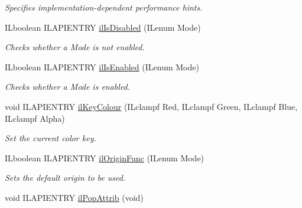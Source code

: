 \begin{DoxyCompactItemize}
\begin{DoxyCompactList}\small\item\em Specifies implementation-\/dependent performance hints. \end{DoxyCompactList}\item 
I\+Lboolean I\+L\+A\+P\+I\+E\+N\+T\+R\+Y \hyperlink{group__state_ga6fdd0b1ac89f9a43bdb3be9a23cbe354}{il\+Is\+Disabled} (I\+Lenum Mode)
\begin{DoxyCompactList}\small\item\em Checks whether a {\itshape Mode} is not enabled. \end{DoxyCompactList}\item 
I\+Lboolean I\+L\+A\+P\+I\+E\+N\+T\+R\+Y \hyperlink{group__state_ga8f2fb1299fd1cf25c2a959aa3837cc48}{il\+Is\+Enabled} (I\+Lenum Mode)
\begin{DoxyCompactList}\small\item\em Checks whether a {\itshape Mode} is enabled. \end{DoxyCompactList}\item 
\hypertarget{group__state_gaf3c1ed8cef65fe9816a3c00486d94fd2}{void I\+L\+A\+P\+I\+E\+N\+T\+R\+Y \hyperlink{group__state_gaf3c1ed8cef65fe9816a3c00486d94fd2}{il\+Key\+Colour} (I\+Lclampf Red, I\+Lclampf Green, I\+Lclampf Blue, I\+Lclampf Alpha)}\label{group__state_gaf3c1ed8cef65fe9816a3c00486d94fd2}

\begin{DoxyCompactList}\small\item\em Set the current color key. \end{DoxyCompactList}\item 
I\+Lboolean I\+L\+A\+P\+I\+E\+N\+T\+R\+Y \hyperlink{group__state_gab518656efaed3f7ca95857e367e62ccd}{il\+Origin\+Func} (I\+Lenum Mode)
\begin{DoxyCompactList}\small\item\em Sets the default origin to be used. \end{DoxyCompactList}\item 
\hypertarget{group__state_gacc9ee35a9e48b55880655f6d143f39c1}{void I\+L\+A\+P\+I\+E\+N\+T\+R\+Y \hyperlink{group__state_gacc9ee35a9e48b55880655f6d143f39c1}{il\+Pop\+Attrib} (void)}\label{group__state_gacc9ee35a9e48b55880655f6d143f39c1}


\end{DoxyCompactItemize}
